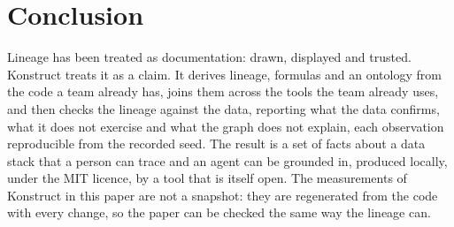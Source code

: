\section{Conclusion}
\label{sec:conclusion}

Lineage has been treated as documentation: drawn, displayed and trusted. Konstruct treats it as
a claim. It derives lineage, formulas and an ontology from the code a team already has, joins them
across the tools the team already uses, and then checks the lineage against the data, reporting
what the data confirms, what it does not exercise and what the graph does not explain, each
observation reproducible from the recorded seed. The result is a set of facts about a data stack
that a person can trace and an agent can be grounded in, produced locally, under the MIT licence,
by a tool that is itself open. The measurements of Konstruct in this paper are not a snapshot:
they are regenerated from the code with every change, so the paper can be checked the same way
the lineage can.
